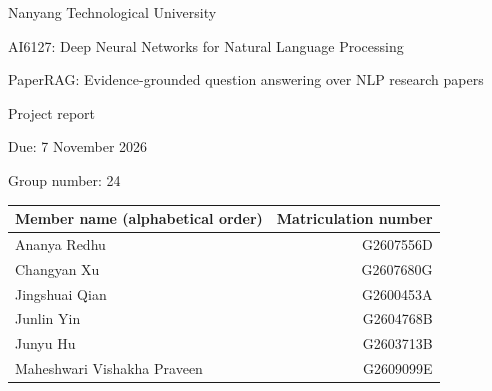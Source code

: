 \documentclass[11pt,a4paper]{article}
\renewcommand{\arraystretch}{1.2}
\begin{document}
\raggedbottom
\begin{titlepage}
\centering
{\large Nanyang Technological University\par}
{\large AI6127: Deep Neural Networks for Natural Language Processing\par}
\vspace{17mm}
{\LARGE PaperRAG: Evidence-grounded question answering over NLP research papers\par}
\vspace{9mm}
{\large Project report\par}
{Due: 7 November 2026\par}\vspace{8mm}
Group number: 24\par\vspace{6mm}
\begingroup
\renewcommand{\arraystretch}{1}\setlength{\tabcolsep}{6pt}
\begin{tabularx}{\textwidth}{Yr}\toprule
Member name (alphabetical order) & Matriculation number\\\midrule
Ananya Redhu & G2607556D\\
Changyan Xu & G2607680G\\
Jingshuai Qian & G2600453A\\
Junlin Yin & G2604768B\\
Junyu Hu & G2603713B\\
Maheshwari Vishakha Praveen & G2609099E\\\bottomrule
\end{tabularx}
\endgroup
\vspace{6mm}
\vfill

\end{titlepage}
\begin{abstract}
Investigating an NLP research topic often requires searching many papers and piecing together methods and findings scattered across their sections. Researchers must locate relevant evidence, compare approaches and trace claims to their sources, making literature exploration time-consuming. PaperRAG aims to reduce this effort through a question-answering interface that helps users identify useful papers and inspect the evidence behind an answer. It retrieves passages from an indexed collection of NLP papers and generates evidence-grounded answers with inspectable citations. The system indexes 28,617 section-aware passages from 1,584 papers and combines BM25 and dense retrieval through reciprocal rank fusion (RRF). A bounded evidence-gap critic can request additional retrieval before Qwen3-8B generates a cited answer or refuses. The interface supports both selected-paper and collection-wide search; formal evaluation uses selected-paper questions. On 200 questions with pooled relevance judgments, RRF achieves MRR@5 of 0.804, compared with 0.730 for BM25 and 0.799 for dense retrieval. In the frozen downstream evaluation, adaptive retrieval increases mapped-evidence recall from 0.858 to 0.871, but shows no clear advantage at a matched passage budget. Answer token F1 is 0.368 for static retrieval and 0.366 for adaptive retrieval, providing no evidence of improved answer quality from the loop. These results support static hybrid retrieval as a practical baseline and identify critic calibration as a priority for further work.
\end{abstract}
\end{document}
